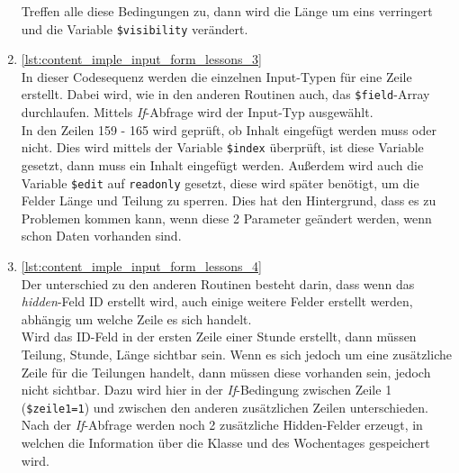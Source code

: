 \begin{enumerate}
	Treffen alle diese Bedingungen zu, dann wird die Länge um eins verringert und die Variable \texttt{\$visibility} verändert.\\
	
	
	
	\item \autoref{lst:content_imple_input_form_lessons_3}\\
	In dieser Codesequenz werden die einzelnen Input-Typen für eine Zeile erstellt. Dabei wird, wie in den anderen Routinen auch, das \texttt{\$field}-Array durchlaufen. Mittels \textit{If}-Abfrage wird der Input-Typ ausgewählt.\\
	In den Zeilen 159 - 165 wird geprüft, ob Inhalt eingefügt werden muss oder nicht. Dies wird mittels der Variable \texttt{\$index} überprüft, ist diese Variable gesetzt, dann muss ein Inhalt eingefügt werden. Außerdem wird auch die Variable \texttt{\$edit} auf \texttt{readonly} gesetzt, diese wird später benötigt, um die Felder Länge und Teilung zu sperren. Dies hat den Hintergrund, dass es zu Problemen kommen kann, wenn diese 2 Parameter geändert werden, wenn schon Daten vorhanden sind.\\

\newpage
	
	
	
	\item \autoref{lst:content_imple_input_form_lessons_4}\\
	Der unterschied zu den anderen Routinen besteht darin, dass wenn das \textit{hidden}-Feld ID erstellt wird, auch einige weitere Felder erstellt werden, abhängig um welche Zeile es sich handelt.\\
	Wird das ID-Feld in der ersten Zeile einer Stunde erstellt, dann müssen Teilung, Stunde, Länge sichtbar sein. Wenn es sich jedoch um eine zusätzliche Zeile für die Teilungen handelt, dann müssen diese vorhanden sein, jedoch nicht sichtbar. Dazu wird hier in der \textit{If}-Bedingung zwischen Zeile 1 (\texttt{\$zeile1=1}) und zwischen den anderen zusätzlichen Zeilen unterschieden.\\
	Nach der \textit{If}-Abfrage werden noch 2 zusätzliche Hidden-Felder erzeugt, in welchen die Information über die Klasse und des Wochentages gespeichert wird.\\
	
	

\end{enumerate}

